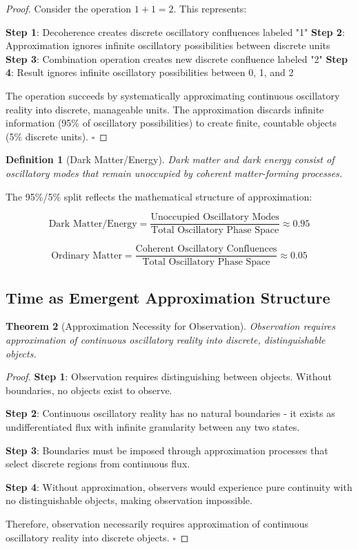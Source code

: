 \documentclass[11pt,a4paper]{article}
\newtheorem{theorem}{Theorem}[section]
\newtheorem{definition}[theorem]{Definition}
\theoremstyle{remark}
\begin{document}
\begin{proof}
Consider the operation $1 + 1 = 2$. This represents:

\textbf{Step 1}: Decoherence creates discrete oscillatory confluences labeled "1"
\textbf{Step 2}: Approximation ignores infinite oscillatory possibilities between discrete units
\textbf{Step 3}: Combination operation creates new discrete confluence labeled "2"
\textbf{Step 4}: Result ignores infinite oscillatory possibilities between 0, 1, and 2

The operation succeeds by systematically approximating continuous oscillatory reality into discrete, manageable units. The approximation discards infinite information (95\% of oscillatory possibilities) to create finite, countable objects (5\% discrete units). $\square$
\end{proof}

\begin{definition}[Dark Matter/Energy]
Dark matter and dark energy consist of oscillatory modes that remain unoccupied by coherent matter-forming processes.
\end{definition}

The 95\%/5\% split reflects the mathematical structure of approximation:

$$\text{Dark Matter/Energy} = \frac{\text{Unoccupied Oscillatory Modes}}{\text{Total Oscillatory Phase Space}} \approx 0.95$$

$$\text{Ordinary Matter} = \frac{\text{Coherent Oscillatory Confluences}}{\text{Total Oscillatory Phase Space}} \approx 0.05$$

\subsection{Time as Emergent Approximation Structure}

\begin{theorem}[Approximation Necessity for Observation]
Observation requires approximation of continuous oscillatory reality into discrete, distinguishable objects.
\end{theorem}

\begin{proof}
\textbf{Step 1}: Observation requires distinguishing between objects. Without boundaries, no objects exist to observe.

\textbf{Step 2}: Continuous oscillatory reality has no natural boundaries - it exists as undifferentiated flux with infinite granularity between any two states.

\textbf{Step 3}: Boundaries must be imposed through approximation processes that select discrete regions from continuous flux.

\textbf{Step 4}: Without approximation, observers would experience pure continuity with no distinguishable objects, making observation impossible.

Therefore, observation necessarily requires approximation of continuous oscillatory reality into discrete objects. $\square$
\end{proof}
\end{document}
